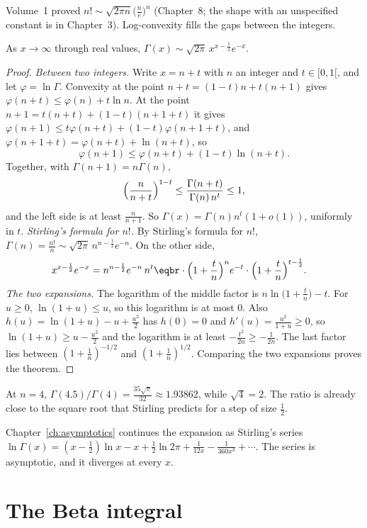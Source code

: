 Volume~1 proved $n!\sim\sqrt{2\pi n}\bigl(\frac ne\bigr)^n$ (Chapter~8; the shape with an unspecified constant is in Chapter~3). Log-convexity fills the gaps between the integers.

\begin{theorem}\label{thm:stirlinggamma}
As $x\to\infty$ through real values, $\Gamma(x)\sim\sqrt{2\pi}\,x^{x-\frac12}e^{-x}$.
\end{theorem}
\begin{proof}
\emph{Between two integers.}
Write $x=n+t$ with $n$ an integer and $t\in[0,1[$, and let $\varphi=\ln\Gamma$. Convexity at the point $n+t=(1-t)n+t(n+1)$ gives
$\varphi(n+t)\le\varphi(n)+t\ln n$. At the point $n+1=t(n+t)+(1-t)(n+1+t)$ it gives
$\varphi(n+1)\le t\varphi(n+t)+(1-t)\varphi(n+1+t)$, and $\varphi(n+1+t)=\varphi(n+t)+\ln(n+t)$, so
\[
\varphi(n+1)\le\varphi(n+t)+(1-t)\ln(n+t).
\]
Together, with $\Gamma(n+1)=n\Gamma(n)$,
\[
\Bigl(\frac n{n+t}\Bigr)^{1-t}\le\frac{\Gamma(n+t)}{\Gamma(n)\,n^t}\le1,
\]
and the left side is at least $\frac n{n+1}$. So $\Gamma(x)=\Gamma(n)n^t(1+o(1))$, uniformly in $t$.
\emph{Stirling's formula for $n!$.}
By Stirling's formula for $n!$,
$\Gamma(n)=\frac{n!}n\sim\sqrt{2\pi}\,n^{n-\frac12}e^{-n}$. On the other side,
\[
\begin{aligned}x^{x-\frac12}e^{-x}&=n^{n-\frac12}e^{-n}\,n^t\eqbr\cdot\Bigl(1+\frac tn\Bigr)^n e^{-t}\cdot\Bigl(1+\frac tn\Bigr)^{t-\frac12}.\end{aligned}
\]
\emph{The two expansions.}
The logarithm of the middle factor is $n\ln\bigl(1+\frac tn\bigr)-t$. For $u\ge0$, $\ln(1+u)\le u$, so this logarithm is at most $0$. Also $h(u)=\ln(1+u)-u+\frac{u^2}2$ has $h(0)=0$ and $h'(u)=\frac{u^2}{1+u}\ge0$, so $\ln(1+u)\ge u-\frac{u^2}2$ and the logarithm is at least $-\frac{t^2}{2n}\ge-\frac1{2n}$. The last factor lies between
$(1+\frac1n)^{-1/2}$ and $(1+\frac1n)^{1/2}$. Comparing the two expansions proves the theorem.
\end{proof}

At $n=4$, $\Gamma(4.5)/\Gamma(4)=\frac{35\sqrt\pi}{32}\approx1.93862$, while $\sqrt4=2$. The ratio is already close to the square root that Stirling predicts for a step of size $\frac12$.

Chapter~\ref{ch:asymptotics} continues the expansion as Stirling's series $\ln\Gamma(x)=(x-\frac12)\ln x-x+\frac12\ln2\pi+\frac1{12x}-\frac1{360x^3}+\cdots$. The series is asymptotic, and it diverges at every $x$.

\section{The Beta integral}

